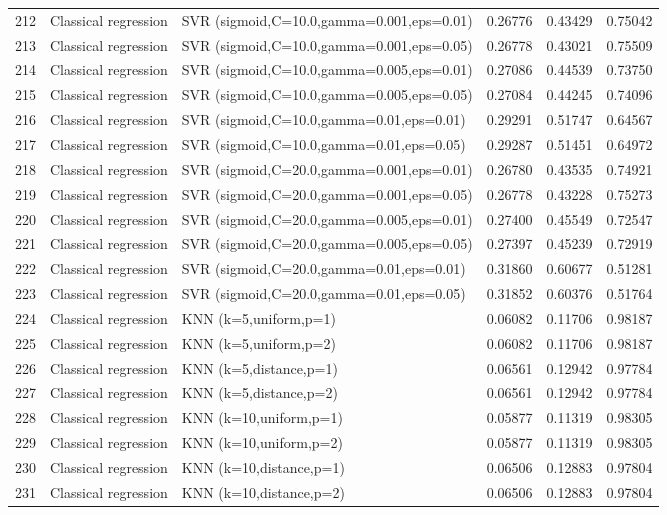 \documentclass[10pt]{article}
\begin{document}
\begin{longtable}{C{0.75cm}L{2.35cm}L{8.0cm}C{1.15cm}C{1.15cm}C{1.15cm}}
212 & Classical regression & SVR (sigmoid,C=10.0,gamma=0.001,eps=0.01) & 0.26776 & 0.43429 & 0.75042 \\
213 & Classical regression & SVR (sigmoid,C=10.0,gamma=0.001,eps=0.05) & 0.26778 & 0.43021 & 0.75509 \\
214 & Classical regression & SVR (sigmoid,C=10.0,gamma=0.005,eps=0.01) & 0.27086 & 0.44539 & 0.73750 \\
215 & Classical regression & SVR (sigmoid,C=10.0,gamma=0.005,eps=0.05) & 0.27084 & 0.44245 & 0.74096 \\
216 & Classical regression & SVR (sigmoid,C=10.0,gamma=0.01,eps=0.01) & 0.29291 & 0.51747 & 0.64567 \\
217 & Classical regression & SVR (sigmoid,C=10.0,gamma=0.01,eps=0.05) & 0.29287 & 0.51451 & 0.64972 \\
218 & Classical regression & SVR (sigmoid,C=20.0,gamma=0.001,eps=0.01) & 0.26780 & 0.43535 & 0.74921 \\
219 & Classical regression & SVR (sigmoid,C=20.0,gamma=0.001,eps=0.05) & 0.26778 & 0.43228 & 0.75273 \\
220 & Classical regression & SVR (sigmoid,C=20.0,gamma=0.005,eps=0.01) & 0.27400 & 0.45549 & 0.72547 \\
221 & Classical regression & SVR (sigmoid,C=20.0,gamma=0.005,eps=0.05) & 0.27397 & 0.45239 & 0.72919 \\
222 & Classical regression & SVR (sigmoid,C=20.0,gamma=0.01,eps=0.01) & 0.31860 & 0.60677 & 0.51281 \\
223 & Classical regression & SVR (sigmoid,C=20.0,gamma=0.01,eps=0.05) & 0.31852 & 0.60376 & 0.51764 \\
224 & Classical regression & KNN (k=5,uniform,p=1) & 0.06082 & 0.11706 & 0.98187 \\
225 & Classical regression & KNN (k=5,uniform,p=2) & 0.06082 & 0.11706 & 0.98187 \\
226 & Classical regression & KNN (k=5,distance,p=1) & 0.06561 & 0.12942 & 0.97784 \\
227 & Classical regression & KNN (k=5,distance,p=2) & 0.06561 & 0.12942 & 0.97784 \\
228 & Classical regression & KNN (k=10,uniform,p=1) & 0.05877 & 0.11319 & 0.98305 \\
229 & Classical regression & KNN (k=10,uniform,p=2) & 0.05877 & 0.11319 & 0.98305 \\
230 & Classical regression & KNN (k=10,distance,p=1) & 0.06506 & 0.12883 & 0.97804 \\
231 & Classical regression & KNN (k=10,distance,p=2) & 0.06506 & 0.12883 & 0.97804 \\

\end{longtable}
\end{document}

